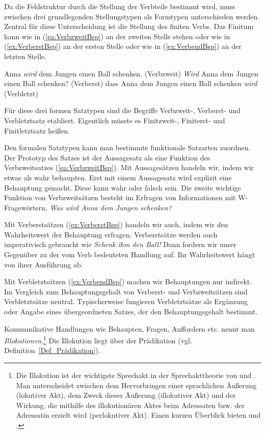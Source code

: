 Da die Feldstruktur durch die Stellung der Verbteile bestimmt wird, muss zwischen drei grundlegenden Stellungstypen als Formtypen unterschieden werden. Zentral für diese Unterscheidung ist die Stellung des finiten Verbs. Das Finitum kann wie in (\ref{ea:VerbzweitBsp}) an der zweiten Stelle stehen oder wie in (\ref{ex:VerberstBsp}) an der ersten Stelle oder wie in (\ref{ex:VerbendBsp}) an der letzten Stelle.   

\ea
\ea \label{ea:VerbzweitBsp} Anna \textit{wird} dem Jungen einen Ball schenken. (Verbzweit)
\ex \label{ex:VerberstBsp} \textit{Wird} Anna dem Jungen einen Ball schenken? (Verberst)
\ex \label{ex:VerbendBsp} dass Anna dem Jungen einen Ball schenken \textit{wird} (Verbletzt) 
\z 
\z 

Für diese drei formen Satztypen sind die Begriffe Verbzweit-, Verberst- und Verbletztsatz etabliert. Eigentlich müsste es Finitzweit-, Finiterst- und Finitletztsatz heißen.

Den formalen Satztypen kann man bestimmte funktionale Satzarten zuordnen. Der Prototyp des Satzes ist der Aussagesatz als eine Funktion des Verbzweitsatzes (\ref{ea:VerbzweitBsp}). Mit Aussagesätzen handeln wir, indem wir etwas als wahr behaupten. Erst mit einem Aussagesatz wird explizit eine Behauptung gemacht. Diese kann wahr oder falsch sein. Die zweite wichtige Funktion von Verbzweitsätzen besteht im Erfragen von Informationen mit W-Fragewörtern, \zB \textit{Was wird Anna dem Jungen schenken?}

Mit Verberstsätzen (\ref{ex:VerberstBsp}) handeln wir auch, indem wir den Wahrheitswert der Behauptung erfragen. Verberstsätze werden auch imperativisch gebraucht wie \textit{Schenk ihm den Ball!} Dann fordern wir unser Gegenüber zu der vom Verb bedeuteten Handlung auf. Ihr Wahrheitswert hängt von ihrer Ausführung ab. 

Mit Verbletztsätzen (\ref{ex:VerbendBsp}) machen wir Behauptungen nur indirekt. Im Vergleich zum Behauptungsgehalt von Verberst- und Verbzweitsätzen sind Verbletztsätze neutral. Typischerweise fungieren Verbletztsätze als Ergänzung oder Angabe eines übergeordneten Satzes, der den Behauptungsgehalt bestimmt.   

Kommunikative Handlungen wie Behaupten, Fragen, Auffordern etc. nennt man \textit{Illokutionen}.\footnote{Die Illokution ist der wichtigste Sprechakt in der Sprechakttheorie von \citet{Austin1962} und \citet{Searle1969}. Man unterscheidet zwischen dem Hervorbringen einer sprachlichen Äußerung (lokutiver Akt), dem Zweck dieser Äußerung (illokutiver Akt) und der Wirkung, die mithilfe des illokutionären Aktes beim Adressaten bzw. der Adressatin erzielt wird (perlokutiver Akt). Einen kurzen Überblick bieten \citet[218--220]{Stukenbrock2013} und \citet[146--148]{Klabunde2023Pragmatik}.} Die Illokution liegt über der Prädikation (vgl. Definition~\ref{Def_Prädikation}).

